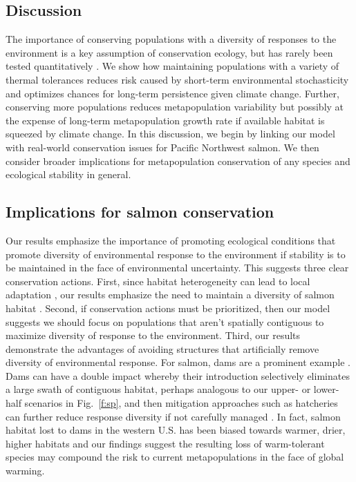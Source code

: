 \documentclass[12pt,english]{article}
\begin{document}
\begin{spacing}{1.3}
\section{Discussion}\label{discussion}

The importance of conserving populations with a diversity of responses to the environment is a key assumption of conservation ecology, but has rarely been tested quantitatively \citep{mori2013}. We show how maintaining populations with a variety of thermal tolerances reduces risk caused by short-term environmental stochasticity and optimizes chances for long-term persistence given climate change. Further, conserving more populations reduces metapopulation variability but possibly at the expense of long-term metapopulation growth rate if available habitat is squeezed by climate change. In this discussion, we begin by linking our model with real-world conservation issues for Pacific Northwest salmon. We then consider broader implications for metapopulation conservation of any species and ecological stability in general.

\subsection{Implications for salmon conservation}\label{implications-for-salmon-conservation}

Our results emphasize the importance of promoting ecological conditions that promote diversity of environmental response to the environment if stability is to be maintained in the face of environmental uncertainty. This suggests three clear conservation actions. First, since habitat heterogeneity can lead to local adaptation \citep[e.g.][]{fraser2011}, our results emphasize the need to maintain a diversity of salmon habitat \citep{rogers2008}. Second, if conservation actions must be prioritized, then our model suggests we should focus on populations that aren't spatially contiguous to maximize diversity of response to the environment. Third, our results demonstrate the advantages of avoiding structures that artificially remove diversity of environmental response. For salmon, dams are a prominent example \citep{mcclure2008a}. Dams can have a double impact whereby their introduction selectively eliminates a large swath of contiguous habitat, perhaps analogous to our upper- or lower-half scenarios in Fig.~\ref{f:sp}, and then mitigation approaches such as hatcheries can further reduce response diversity if not carefully managed \citep{mcclure2008b}. In fact, salmon habitat lost to dams in the western U.S. has been biased towards warmer, drier, higher habitats \citep{mcclure2008a} and our findings suggest the resulting loss of warm-tolerant species may compound the risk to current metapopulations in the face of global warming.


\end{spacing}
\end{document}
